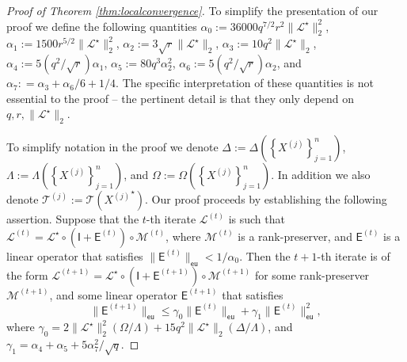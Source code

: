 \documentclass[11pt,letterpaper]{article}
\newcommand{\ct}{\mathcal{T}}
\newcommand{\sfe}{\mathsf{E}}
\newcommand{\sfi}{\mathsf{I}}
\newcommand{\eu}{\mathsf{eu}}
\newcommand{\roc}{\Omega}
\newcommand{\coveig}{\Lambda}
\newcommand{\covsup}{\Delta}
\begin{document}
\begin{proof}[Proof of Theorem \ref{thm:localconvergence}]
To simplify the presentation of our proof we define the following quantities $\alpha_0:=36000q^{7/2}r^2\|\mathcal{L}^{\star}\|_2^2$, $\alpha_1:= 1500 r^{5/2} \|\mathcal{L}^{\star}\|_{2}^2$, $\alpha_2 := 3 \sqrt{r} \|\mathcal{L}^{\star}\|_{2}$, $\alpha_3:= 10 q^2 \|\mathcal{L}^{\star}\|_{2}$, $\alpha_4 := 5 (q^2/\sqrt{r}) \alpha_1$, $\alpha_5:= 80q^3 \alpha_2^2$, $\alpha_6:=5 (q^2/\sqrt{r}) \alpha_2$, and $\alpha_7: = \alpha_3 + \alpha_6/6 + 1/4$.  The specific interpretation of these quantities is not essential to the proof -- the pertinent detail is that they only depend on $q,r,\|\mathcal{L}^{\star}\|_{2}$.

To simplify notation in the proof we denote $\covsup:= \covsup \left(\left\{X^{(j)}\right\}_{j=1}^{n}\right)$, $\coveig:= \coveig \left(\left\{X^{(j)}\right\}_{j=1}^{n}\right)$, and $\roc:= \roc \left(\left\{X^{(j)}\right\}_{j=1}^{n}\right)$.  In addition we also denote $\ct^{(j)}:= \ct ({X^{(j)}}^{\star} )$.  Our proof proceeds by establishing the following assertion.  Suppose that the $t$-th iterate $\mathcal{L}^{(t)}$ is such that $\mathcal{L}^{(t)} = \mathcal{L}^{\star} \circ (\sfi + \sfe^{(t)}) \circ \mathcal{M}^{(t)}$, where $\mathcal{M}^{(t)}$ is a rank-preserver, and $\sfe^{(t)}$ is a linear operator that satisfies $\|\sfe^{(t)}\|_{\eu} < 1/ \alpha_0$.  Then the $t+1$-th iterate is of the form $\mathcal{L}^{(t+1)} = \mathcal{L}^{\star} \circ (\sfi + \sfe^{(t+1)}) \circ \mathcal{M}^{(t+1)}$ for some rank-preserver $\mathcal{M}^{(t+1)}$, and some linear operator $\sfe^{(t+1)}$ that satisfies
	\begin{equation} \label{eq:maininductivestep}
	\|\sfe^{(t+1)}\|_{\eu} \leq \gamma_0 \|\sfe^{(t)}\|_{\eu} + \gamma_1 \|\sfe^{(t)}\|_{\eu}^2,
	\end{equation}
	where $\gamma_0 = 2 \|\mathcal{L}^{\star}\|_{2}^2 (\roc/\coveig) + 15q^2 \|\mathcal{L}^{\star}\|_{2} (\covsup/\coveig)$, and $\gamma_1 = \alpha_4+\alpha_5 + 5\alpha_7^2/\sqrt{q}$.
	

\end{proof}
\end{document}
